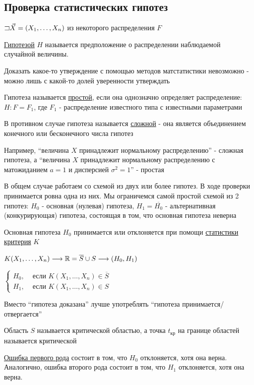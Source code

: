 \documentclass[12pt]{article}
\begin{document}
\subsection{Проверка статистических гипотез}

$\mathord{\sqsupset} \vec X = (X_1, \dots, X_n)$ из некоторого распределения $F$

\Def \underline{Гипотезой} $H$ называется предположение о распределении наблюдаемой случайной величины. 

Доказать какое-то утверждение с помощью методов матстатистики невозможно - можно лишь с какой-то долей 
уверенности утверждать

\Def Гипотеза называется \underline{простой}, если она однозначно определяет распределение: 
$H : F = F_1$, где $F_1$ - распределение известного типа с известными параметрами

В противном случае гипотеза называется \underline{сложной} - она является объединением конечного или бесконечного числа
гипотез

Например, \enquote{величина $X$ принадлежит нормальному распределению} - сложная гипотеза, а 
\enquote{величина $X$ принадлежит нормальному распределению с матожиданием $a = 1$ и дисперсией $\sigma^2 = 1$} - простая


В общем случае работаем со схемой из двух или более гипотез. В ходе проверки принимается ровна одна из них.
Мы ограничемся самой простой схемой из 2 гипотез: $H_0$ - основная (нулевая) гипотеза, $H_1 = \overline{H_0}$ - 
альтернативная (конкурирующая) гипотеза, состоящая в том, что основная гипотеза неверна

Основная гипотеза $H_0$ принимается или отклоняется при помощи \underline{статистики критерия} $K$ 

$K(X_1, \dots, X_n) \longrightarrow \mathbb{R} = \overline{S} \cup S \longrightarrow (H_0, H_1)$

$\begin{cases}
    H_0, & \text{ если } K(X_1, \dots, X_n) \in \overline{S} \\
    H_1, & \text{ если } K(X_1, \dots, X_n) \in S
\end{cases}$

Вместо \enquote{гипотеза доказана} лучше употреблять \enquote{гипотеза принимается/отвергается}

Область $S$ называется критической областью, а точка $t_\text{кр}$ на границе областей называется критической

\Def \underline{Ошибка первого рода} состоит в том, что $H_0$ отклоняется, хотя она верна. 
Аналогично, ошибка второго рода состоит в том, что $H_1$ отклоняется, хотя она верна.
\end{document}
